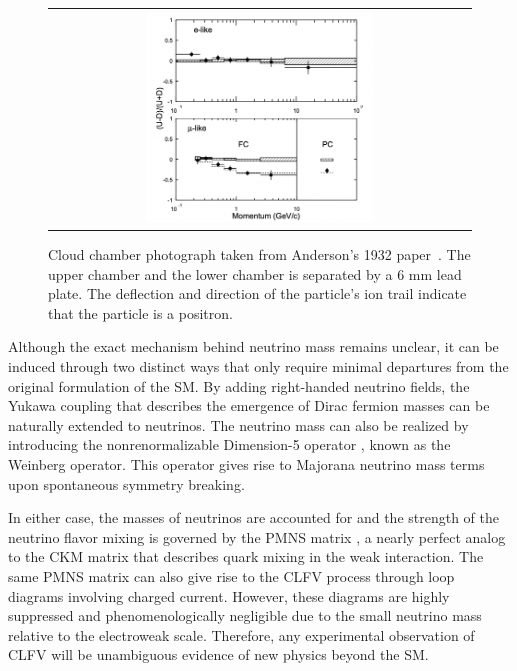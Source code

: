 \begin{figure}[tbh!]
 \begin{center}
 \begin{tabular}{c}
 \includegraphics[width=0.55\textwidth]{figures/Part1/BSM/SuperK}
 \end{tabular}
 \caption{Cloud chamber photograph taken from Anderson's 1932 paper~\cite{Super-Kamiokande:1998kpq}. The upper chamber and the lower chamber is separated by a 6 mm lead plate. The deflection and direction of the particle's ion trail indicate that the particle is a positron.}
 \label{fig:Positron}
 \end{center}
\end{figure}

Although the exact mechanism behind neutrino mass remains unclear, it can be induced through two distinct ways that only require minimal departures from the original formulation of the \ac{SM}. By adding right-handed neutrino fields, the Yukawa coupling \cite{Weinberg:1967tq} that describes the emergence of Dirac fermion masses can be naturally extended to neutrinos. The neutrino mass can also be realized by introducing the nonrenormalizable Dimension-5 operator \cite{Weinberg:1979sa}, known as the Weinberg operator. This operator gives rise to Majorana neutrino mass terms upon spontaneous symmetry breaking. 

In either case, the masses of neutrinos are accounted for and the strength of the neutrino flavor mixing is governed by the \ac{PMNS} matrix \cite{Pontecorvo:1957cp,Maki:1962mu}, a nearly perfect analog to the \ac{CKM} matrix \cite{Cabibbo:1963yz,Kobayashi:1973fv} that describes quark mixing in the weak interaction. The same \ac{PMNS} matrix can also give rise to the \ac{CLFV} process through loop diagrams involving charged current. However, these diagrams are highly suppressed and phenomenologically negligible due to the small neutrino mass relative to the electroweak scale. Therefore, any experimental observation of \ac{CLFV} will be unambiguous evidence of new physics beyond the \ac{SM}.

